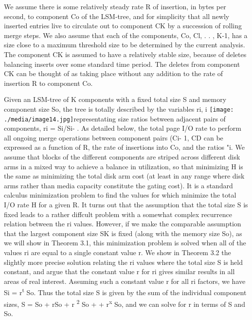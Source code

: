 \documentclass[a4paper,11pt,notitlepage,twoside,openright]{article}
\begin{document}
We assume there is some relatively steady rate R of insertion, in bytes
per second, to component Co of the LSM-tree, and for simplicity that all
newly inserted entries live to circulate out to component CK by a
succession of rolling merge steps. We also assume that each of the
components, Co, Cl, . . , K-1, has a size close to a maximum threshold
size to be determined by the current analysis. The component CK is
assumed to have a relatively stable size, because of deletes balancing
inserts over some standard time period. The deletes from component CK
can be thought of as taking place without any addition to the rate of
insertion R to component Co.

Given an LSM-tree of K components with a fixed total size S and memory
component size So, the tree is totally described by the variables ri, i
\texttt{[image: ./media/image14.jpg]}representating
size ratios between adjacent pairs of components, ri = Si/Si- . As
detailed below, the total page I/O rate to perform all ongoing merge
operations between component pairs (Ci- 1, CD can be expressed as a
function of R, the rate of insertions into Co, and the ratios "i. We
assume that blocks of the different components are striped across
different disk arms in a mixed way to achieve a balance in utilization,
so that minimizing H is the same as minimizing the total disk arm cost
(at least in any range where disk arms rather than media capacity
constitute the gating cost). It is a standard calculus minimization
problem to find the values for which minimize the total I/O rate H for a
given R. It turns out that the assumption that the total size S is fixed
leads to a rather diffcult problem with a somewhat complex recurrence
relation between the ri values. However, if we make the comparable
assumption that the largest component size SK is fixed (along with the
memory size So), as we will show in Theorem 3.1, this minimization
problem is solved when all of the values ri are equal to a single
constant value r. We show in Theorem 3.2 the slightly more precise
solution relating the ri values where the total size S is held constant,
and argue that the constant value r for ri gives similar results in all
areas of real interest. Assuming such a constant value r for all ri
factors, we have Si = r\textsuperscript{t} So. Thus the total size S is
given by the sum of the individual component sizes, S = So + rSo + r
\textsuperscript{2} So + + r\textsuperscript{x} So, and we can solve for
r in terms of S and So.
\end{document}
